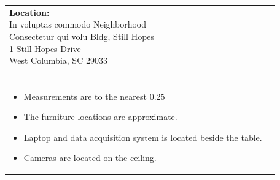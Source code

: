 \documentclass[12pt]{article}
\begin{document}
    \vspace*{\fill}  %
    \begin{table}[H]
	\begin{tabular}{l l}
		\makecell[lt]{
			\textbf{Location:}\\
     		In voluptas commodo  Neighborhood \\
 		    Consectetur qui volu Bldg, Still Hopes\\
           	1 Still Hopes Drive\\
           	West Columbia, SC 29033\\\\
        }   	
        &	
		\makecell[tp{5in}]{
		\textbf{Notes:}\\
		\vspace{-8mm}  %
		\begin{itemize}
			\setlength\itemsep{-3mm}  %
			\item Measurements are to the nearest \SI{0.25}{\inch}
			\item The furniture locations are approximate.
			\item Laptop and data acquisition system is located beside the table.
			\item Cameras are located on the ceiling.
		\end{itemize}
		}	
			
	\end{tabular}
	\vspace{-8mm} %
\end{table}

    
\end{document}
